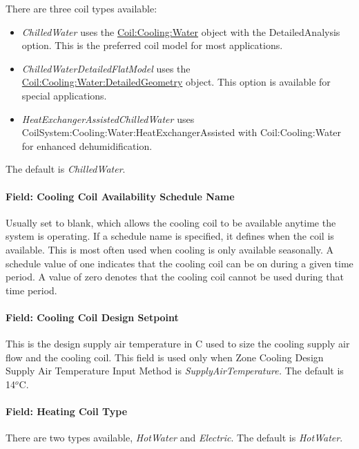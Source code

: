 There are three coil types available:

\begin{itemize}
\item
  \emph{ChilledWater} uses the \hyperref[coilcoolingwater]{Coil:Cooling:Water} object with the DetailedAnalysis option. This is the preferred coil model for most applications.
\item
   \emph{ChilledWaterDetailedFlatModel} uses the \hyperref[coilcoolingwaterdetailedgeometry]{Coil:Cooling:Water:DetailedGeometry} object. This option is available for special applications.
\item
   \emph{HeatExchangerAssistedChilledWater} uses CoilSystem:Cooling:Water:HeatExchangerAssisted with Coil:Cooling:Water for enhanced dehumidification.
\end{itemize}

The default is \emph{ChilledWater}.

\paragraph{Field: Cooling Coil Availability Schedule Name}\label{field-cooling-coil-availability-schedule-name}

Usually set to blank, which allows the cooling coil to be available anytime the system is operating. If a schedule name is specified, it defines when the coil is available. This is most often used when cooling is only available seasonally. A schedule value of one indicates that the cooling coil can be on during a given time period. A value of zero denotes that the cooling coil cannot be used during that time period.

\paragraph{Field: Cooling Coil Design Setpoint}\label{field-cooling-coil-design-setpoint}

This is the design supply air temperature in C used to size the cooling supply air flow and the cooling coil. This field is used only when Zone Cooling Design Supply Air Temperature Input Method is \emph{SupplyAirTemperature.} The default is 14\(^{o}\)C.

\paragraph{Field: Heating Coil Type}\label{field-heating-coil-type}

There are two types available, \emph{HotWater} and \emph{Electric}. The default is \emph{HotWater}.

